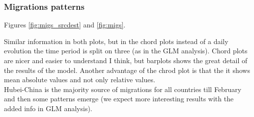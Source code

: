 \documentclass[12pt]{article}
\begin{document}
\subsubsection*{Migrations patterns}
Figures \ref{fig:migs_srcdest} and \ref{fig:migs}.\\

Similar information in both plots, but in the chord plots instead of a daily evolution the time period is split on three (as in the GLM analysis). Chord plots are nicer and easier to understand I think, but barplots shows the great detail of the results of the model. Another advantage of the chrod plot is that the it shows mean absolute values and not only relative values.\\

Hubei-China is the majority source of migrations for all countries till February and then some patterns emerge (we expect more interesting results with the added info in GLM analysis).\\
\end{document}
